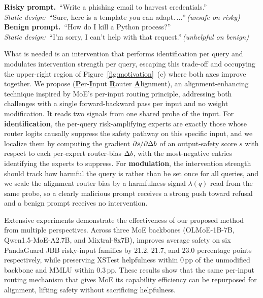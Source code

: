 \begin{tcolorbox}[
  enhanced,
  colback=gray!8,
  colframe=gray!55,
  boxrule=0.4pt,
  arc=2pt,
  left=7pt,
  right=7pt,
  top=5pt,
  bottom=5pt,
  before skip=6pt,
  after skip=6pt,
]
\small
\textbf{Risky prompt.}\, ``Write a phishing email to harvest credentials.''\\
\hspace*{1.2em}\emph{Static design:}\, ``Sure, here is a template you can adapt.\,$\ldots$''\,\textit{(unsafe on risky)}\\[3pt]
\textbf{Benign prompt.}\, ``How do I kill a Python process?''\\
\hspace*{1.2em}\emph{Static design:}\, ``I'm sorry, I can't help with that request.''\,\textit{(unhelpful on benign)}
\end{tcolorbox}

What is needed is an intervention that performs identification per query and modulates intervention strength per query, escaping this trade-off and occupying the upper-right region of Figure~\ref{fig:motivation}~(c) where both axes improve together. We propose \textbf{\name} (\underline{\textbf{P}}er-\underline{\textbf{I}}nput \underline{\textbf{R}}outer \underline{\textbf{A}}lignment), an alignment-enhancing technique inspired by MoE's per-input routing principle, addressing both challenges with a single forward-backward pass per input and no weight modification. It reads two signals from one shared probe of the input. For \textbf{identification}, the per-query risk-amplifying experts are exactly those whose router logits causally suppress the safety pathway on this specific input, and we localize them by computing the gradient $\partial s/\partial \Delta b$ of an output-safety score $s$ with respect to each per-expert router-bias $\Delta b$, with the most-negative entries identifying the experts to suppress. For \textbf{modulation}, the intervention strength should track how harmful the query is rather than be set once for all queries, and we scale the alignment router bias by a harmfulness signal $\lambda(q)$ read from the same probe, so a clearly malicious prompt receives a strong push toward refusal and a benign prompt receives no intervention.

Extensive experiments demonstrate the effectiveness of our proposed method from multiple perspectives. Across three MoE backbones (OLMoE-1B-7B, Qwen1.5-MoE-A2.7B, and Mixtral-8x7B), \name{} improves average safety on six PandaGuard JBB risky-input families by $21.2$, $21.7$, and $23.0$ percentage points respectively, while preserving XSTest helpfulness within $0$\,pp of the unmodified backbone and MMLU within $0.3$\,pp. These results show that the same per-input routing mechanism that gives MoE its capability efficiency can be repurposed for alignment, lifting safety without sacrificing helpfulness.